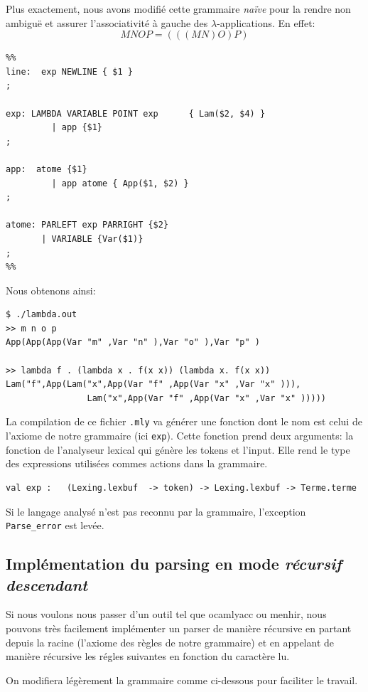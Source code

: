 Plus exactement, nous avons modifié cette grammaire \textit{naïve} pour la
rendre non ambiguë et assurer l'associativité à gauche des
$\lambda$-applications.
En effet: 
$$ M N O P = (((M N) O) P) $$
\begin{Verbatim}
%% 
line:  exp NEWLINE { $1 }
;

exp: LAMBDA VARIABLE POINT exp		{ Lam($2, $4) }
		 | app {$1}
;

app:  atome {$1}
		 | app atome { App($1, $2) }
;

atome: PARLEFT exp PARRIGHT {$2}
       | VARIABLE {Var($1)}
;		
%%
\end{Verbatim}
Nous obtenons ainsi:
\begin{Verbatim}
$ ./lambda.out
>> m n o p
App(App(App(Var "m" ,Var "n" ),Var "o" ),Var "p" )

>> lambda f . (lambda x . f(x x)) (lambda x. f(x x))
Lam("f",App(Lam("x",App(Var "f" ,App(Var "x" ,Var "x" ))),
				Lam("x",App(Var "f" ,App(Var "x" ,Var "x" )))))
\end{Verbatim}



La compilation de ce fichier \verb+.mly+ va générer une fonction dont le nom
est celui de l'axiome de notre grammaire (ici \verb+exp+). Cette fonction prend deux arguments: la fonction de l'analyseur lexical qui génère les tokens et l'input. Elle rend le type
des expressions utilisées commes actions dans la grammaire.
\begin{Verbatim}
val exp :   (Lexing.lexbuf  -> token) -> Lexing.lexbuf -> Terme.terme
\end{Verbatim}

 Si le langage analysé n'est pas reconnu par la grammaire, l'exception \verb+Parse_error+ est levée.
 \subsection{Implémentation du parsing en mode \textit{récursif descendant}}
 
 Si nous voulons nous passer d'un outil tel que ocamlyacc ou menhir, nous pouvons très facilement implémenter un parser
 de manière récursive en partant depuis la racine (l'axiome des règles de notre grammaire) et en appelant de manière récursive les
 régles suivantes en fonction du caractère lu.
 
 On modifiera légèrement la grammaire comme ci-dessous pour faciliter le travail.
 
